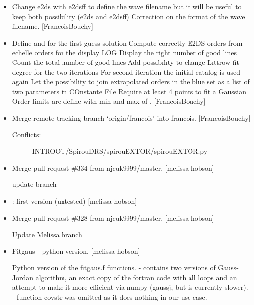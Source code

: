 \documentclass[a4paper,10pt,english]{report}
\begin{document}
\begin{itemize}
\item {} 
Change e2ds with e2dsff to define the wave filename but it will be
useful to keep both possibility (e2ds and e2dsff) Correction on the
format of the wave filename. {[}FrancoisBouchy{]}

\item {} 
Define  and  for the first guess solution Compute
correctly E2DS orders from echelle orders for the display LOG Display
the right number of good lines Count the total number of good lines
Add possibility to change Littrow fit degree for the two iterations
For second iteration the initial catalog is used again Let the
possibility to join extrapolated orders in the blue  set
as a list of two parameters in COnstante File Require at least 4
points to fit a Gaussian Order limits are define with min and max of
. {[}FrancoisBouchy{]}

\item {} 
Merge remote-tracking branch ‘origin/francois’ into francois.
{[}FrancoisBouchy{]}
\begin{description}
\item[{Conflicts:}] \leavevmode
INTROOT/SpirouDRS/spirouEXTOR/spirouEXTOR.py

\end{description}

\item {} 
Merge pull request \#334 from njcuk9999/master. {[}melissa-hobson{]}

update branch

\item {} 
: first version (untested) {[}melissa-hobson{]}

\item {} 
Merge pull request \#328 from njcuk9999/master. {[}melissa-hobson{]}

Update Melissa branch

\item {} 
Fitgaus - python version. {[}melissa-hobson{]}

Python version of the fitgaus.f functions.
- contains two versions of Gauss-Jordan algorithm, an exact copy of the fortran code with all loops  and an attempt to make it more efficient via numpy (gaussj, but is currently slower).
- function covstr was omitted as it does nothing in our use case.


\end{itemize}
\end{document}

